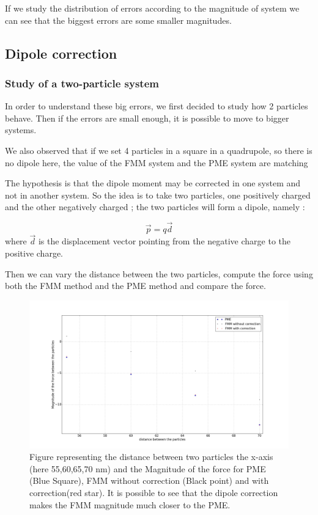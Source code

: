 \documentclass[10pt,twoside,a4paper]{report}
\begin{document}
	If we study the distribution of errors according to the magnitude of system we can see that the biggest errors are some smaller magnitudes.
	

	
\subsection{Dipole correction}
\subsubsection{Study of a two-particle system}
	In order to understand these big errors, we first decided to study how 2 particles behave. Then if the errors are small enough, it is possible to move to bigger systems.
	
We also observed that if we set 4 particles in a square in a quadrupole, so there is no dipole here, the value of the FMM system and the PME system are matching




 	
	
The hypothesis is that the dipole moment may be corrected in one system and not in another system. So the idea is to take two particles, one positively charged and the other negatively charged ; the two particles will form a dipole, namely : 

\begin{equation}
	\vec{p} = q \vec{d}
\end{equation}	
	where $\vec{d}$ is the displacement vector pointing from the negative charge to the positive charge. 
	
	Then we can vary the distance between the two particles, compute the force using both the FMM method and the PME method and compare the force.
	
	
	\begin{figure}[H]
	   \includegraphics[scale=0.2]{dipoleCorrection}
    \centering 
    \caption{Figure representing the distance between two particles the x-axis (here 55,60,65,70 nm) and the  Magnitude of the force for PME (Blue Square), FMM without correction (Black point) and with correction(red star).
     It is possible to see that the dipole correction makes the FMM magnitude much closer to the PME.}    
   \end{figure}  	
	
\end{document}
